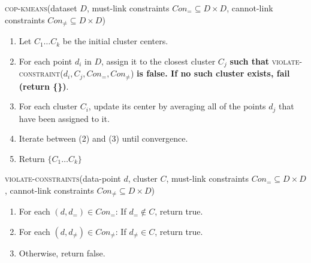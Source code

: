 \documentclass{article}
\begin{document}
  \textsc{cop-kmeans}(dataset $D$, must-link constraints $\mathit{Con}_{=} \subseteq D \times D$, cannot-link constraints $\mathit{Con}_{\neq} \subseteq D \times D$)
  \begin{enumerate}
    \item Let $C_1 \ldots C_k$ be the initial cluster centers.
    \item For each point $d_i$ in $D$, assign it to the closest
      cluster $C_j$ \textbf{such that}
      \textsc{violate-constraint}($d_i, C_j, \mathit{Con}_{=},
      \mathit{Con}_{\neq}$) \textbf{is false. If no such cluster
        exists, fail (return \{\})}.
    \item For each cluster $C_i$, update its center by averaging all
      of the points $d_j$ that have been assigned to it.
    \item Iterate between (2) and (3) until convergence.
    \item Return $\{C_1 \ldots C_k\}$
  \end{enumerate}


  \vspace{10pt}
  \textsc{violate-constraints}(data-point $d$, cluster $C$, must-link constraints $\mathit{Con}_{=} \subseteq D \times D$, cannot-link constraints $\mathit{Con}_{\neq} \subseteq D \times D$)
  \begin{enumerate}
    \item For each $(d,d_{=}) \in \mathit{Con}_{=}$: If $d_{=} \notin C$, return true.
    \item For each $(d,d_{\neq}) \in \mathit{Con}_{\neq}$: If $d_{\neq} \in C$, return true.
    \item Otherwise, return false.
  \end{enumerate}
\end{document}
